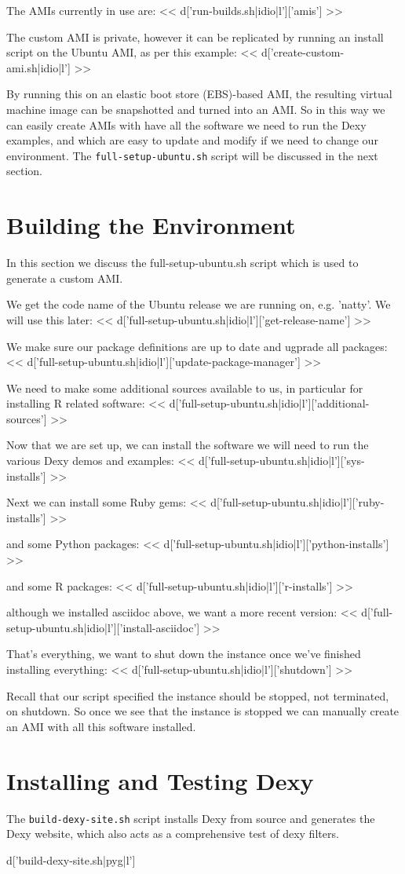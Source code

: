 \documentclass{tufte-handout}
\begin{document}
The AMIs currently in use are:
<< d['run-builds.sh|idio|l']['amis'] >>

The custom AMI is private, however it can be replicated by running an install
script on the Ubuntu AMI, as per this example:
<< d['create-custom-ami.sh|idio|l'] >>

By running this on an elastic boot store (EBS)-based AMI, the resulting virtual machine image can be snapshotted and turned into an AMI. So in this way we can easily create AMIs with have all the software we need to run the Dexy examples, and which are easy to update and modify if we need to change our environment. The \verb=full-setup-ubuntu.sh= script will be discussed in the next section.

\section{Building the Environment}

In this section we discuss the full-setup-ubuntu.sh script which is used to generate a custom AMI.

We get the code name of the Ubuntu release we are running on, e.g. 'natty'. We will use this later:
<< d['full-setup-ubuntu.sh|idio|l']['get-release-name'] >>

We make sure our package definitions are up to date and ugprade all packages:
<< d['full-setup-ubuntu.sh|idio|l']['update-package-manager'] >>

We need to make some additional sources available to us, in particular for installing R related software:
<< d['full-setup-ubuntu.sh|idio|l']['additional-sources'] >>

Now that we are set up, we can install the software we will need to run the various Dexy demos and examples:
<< d['full-setup-ubuntu.sh|idio|l']['sys-installs'] >>

Next we can install some Ruby gems:
<< d['full-setup-ubuntu.sh|idio|l']['ruby-installs'] >>

and some Python packages:
<< d['full-setup-ubuntu.sh|idio|l']['python-installs'] >>

and some R packages:
<< d['full-setup-ubuntu.sh|idio|l']['r-installs'] >>

although we installed asciidoc above, we want a more recent version:
<< d['full-setup-ubuntu.sh|idio|l']['install-asciidoc'] >>

That's everything, we want to shut down the instance once we've finished installing everything:
<< d['full-setup-ubuntu.sh|idio|l']['shutdown'] >>

Recall that our script specified the instance should be stopped, not terminated, on shutdown. So once we see that the instance is stopped we can manually create an AMI with all this software installed.

\section{Installing and Testing Dexy}

The \verb|build-dexy-site.sh| script installs Dexy from source and generates the Dexy website, which also acts as a comprehensive test of dexy filters.

{{ d['build-dexy-site.sh|pyg|l'] }}
\end{document}
